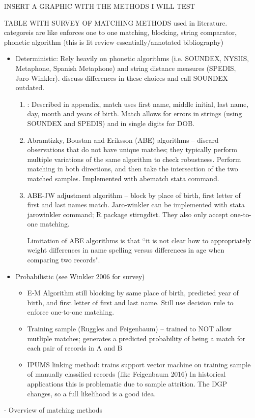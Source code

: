 \documentclass[12pt]{article}
\begin{document}
INSERT A GRAPHIC WITH THE METHODS I WILL TEST



TABLE WITH SURVEY OF MATCHING METHODS used in literature.   categoreis are like enforces one to one matching, blocking, string comparator, phonetic algorithm (this is lit review essentially/annotated bibliography) 
\begin{itemize}
\item Deterministic:  Rely heavily on phonetic algorithms (i.e. SOUNDEX, NYSIIS, Metaphone, Spanish Metaphone) and string distance measures (SPEDIS, Jaro-Winkler).    \cite{abe2019} discuss differences in these choices and call SOUNDEX outdated.
\begin{enumerate}
\item \cite{aizer2016}:  Described in appendix, match uses first name, middle initial, last name, day, month and years of birth.   Match allows for errors in strings (using SOUNDEX and SPEDIS) and in single digits for DOB. 
\item Abramtizky, Boustan and Eriksson (ABE) algorithms -- discard observations that do not have unique matches; they typically perform multiple variations of the same algorithm to check robustness.  Perform matching in both directions, and then take the intersection of the two matched samples.  Implemented with abematch stata command. 
\item ABE-JW adjustment algorithm -- block by place of birth, first letter of first and last names match.  Jaro-winkler can be implemented with stata jarowinkler command; R package stirngdist.  They also only accept one-to-one matching. 

Limitation of ABE algorithms is that ``it is not clear how to
appropriately weight differences in name spelling versus differences in age when comparing two records".  
\end{enumerate}
\item Probabilistic  (see Winkler 2006 for survey)
\begin{itemize}
\item E-M Algorithm \cite{arp2018} still blocking by same place of birth, predicted year of birth, and first letter of first and last name.  Still use decision rule to enforce one-to-one matching. 
\item Training sample (Ruggles and Feigenbaum) -- trained to NOT allow mutliple matches; generates a predicted probability of being a match for each pair of records in A and B
\item IPUMS linking method:  trains support vector machine on training sample of manually classified records (like Feigenbaum 2016)  In historical applications this is problematic due to sample attrition.  The DGP changes, so a full likelihood is a good idea. 
\end{itemize}
\end{itemize}
- Overview of matching methods
\end{document}
